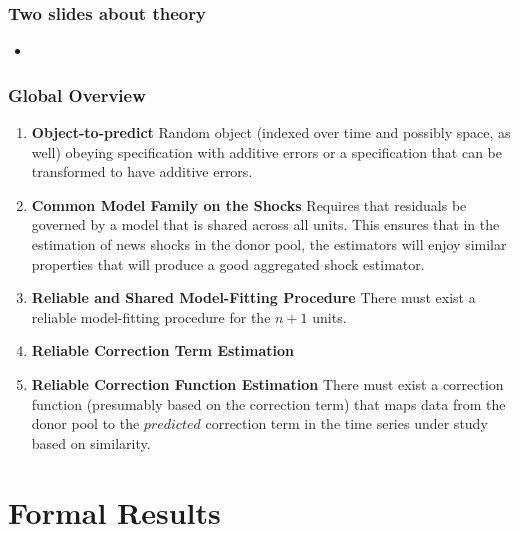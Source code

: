 \documentclass[9pt]{beamer}
\theoremstyle{definition}
\begin{document}
\begin{frame}\frametitle{Two slides about theory}
   
    \begin{itemize}
    \item 
    \end{itemize}
\end{frame}

\begin{frame}\frametitle{Global Overview}

    \begin{enumerate}
        \item \textbf{Object-to-predict}
       Random object (indexed over time and possibly space, as well) obeying specification with additive errors or a specification that can be transformed to have additive errors.  
            
      \item \textbf{Common Model Family on the Shocks} Requires that residuals be governed by a model that is shared across all units.  This ensures that in the estimation of news shocks in the donor pool, the estimators will enjoy similar properties that will produce a good aggregated shock estimator.
      
      \item \textbf{Reliable and Shared Model-Fitting Procedure} There must exist a reliable model-fitting procedure for the $n+1$ units.
      
      \item \textbf{Reliable Correction Term Estimation} 

      \item \textbf{Reliable Correction Function Estimation} There must exist a correction function (presumably based on the correction term) that maps data from the donor pool to the $\textit{predicted}$ correction term in the time series under study based on similarity.  
    \end{enumerate}
\end{frame}

\section{Formal Results}
\end{document}
